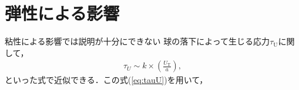 \section{弾性による影響}

粘性による影響では説明が十分にできない
球の落下によって生じる応力$\tau_\text{U}$に関して，
\begin{eqnarray}
    \tau_U \sim k \times \left(\frac{U_\text{T}}{a}\right),
    \label{eq:tauU}
\end{eqnarray}
といった式で近似できる．この式(\ref{eq:tauU})を用いて，
